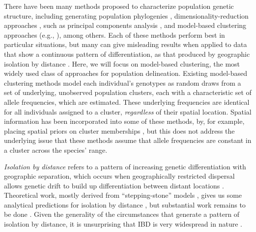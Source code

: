 \documentclass[10pt,letterpaper]{article}
\begin{document}
There have been many methods proposed to characterize population
genetic structure,
including generating population phylogenies \cite{CavalliSforza1975, treemix},
dimensionality-reduction approaches \cite{meirmans2009genodive}, 
such as principal components analysis 
\cite{menozzi1978synthetic,novembre_interpreting_2008, price2006eigenstrat},
and model-based clustering approaches 
(e.g., \cite{STRUCTURE, falush2003, hubisz2009,ADMIXTURE, 
FINESTRUCTURE, fastStructure, huelsenbeck2007inference, 
Corander2003,TESS,geneland}), among others.
Each of these methods perform best in particular situations,
but many can give misleading results when applied to data 
that show a continuous pattern of differentiation,
as that produced by geographic isolation by distance 
\cite{Wright1943, novembre_interpreting_2008, Frantz2009}.
Here, we will focus on model-based clustering, the most widely used class of approaches for population delineation.
Existing model-based clustering methods model each individual's genotypes 
as random draws from a set of underlying, unobserved population clusters, 
each with a characteristic set of allele frequencies, which are estimated. 
These underlying frequencies are identical 
for all individuals assigned to a cluster, 
\emph{regardless} of their spatial location. 
Spatial information has been incorporated into some of these methods, 
by, for example, placing spatial priors on cluster memberships \cite{geneland,TESS}, 
but this does not address the underlying issue that 
these methods assume that allele frequencies 
are constant in a cluster across the species' range.  

\emph{Isolation by distance} refers to a pattern of increasing genetic differentiation
with geographic separation,
which occurs when geographically restricted dispersal allows
genetic drift to build up differentiation between distant locations
\cite{Wright1943}. 
Theoretical work,
mostly derived from ``stepping-stone'' models 
\cite{kimura1964stepping,sawyer1976stepping,shiga1984stepping},
gives us some analytical predictions for isolation by distance
\cite{malecot1969mathematics,Slatkin1985,epperson2003geographical}, 
but substantial work remains to be done \cite{barton2002neutral,barton2013modelling}.
Given the generality of the circumstances that generate a pattern of isolation by distance, 
it is unsurprising that IBD is very widespread in nature \cite{meirmans2012,Sexton_etal_2014}.
\end{document}
